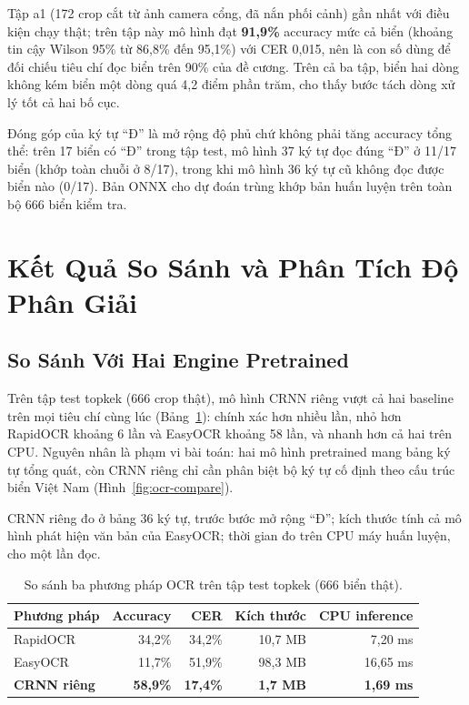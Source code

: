 Tập a1 (172 crop cắt từ ảnh camera cổng, đã nắn phối cảnh) gần nhất với điều kiện chạy thật;
trên tập này mô hình đạt \textbf{91,9\%} accuracy mức cả biển (khoảng tin cậy Wilson 95\% từ
86,8\% đến 95,1\%) với CER 0,015, nên là con số dùng để đối chiếu tiêu chí đọc biển trên
90\% của đề cương. Trên cả ba tập, biển hai dòng không kém biển một
dòng quá 4,2 điểm phần trăm, cho thấy bước tách dòng xử lý tốt cả hai bố cục.

Đóng góp của ký tự ``Đ'' là mở rộng độ phủ chứ không phải tăng accuracy tổng thể: trên 17
biển có ``Đ'' trong tập test, mô hình 37 ký tự đọc đúng ``Đ'' ở 11/17 biển (khớp toàn chuỗi
ở 8/17), trong khi mô hình 36 ký tự cũ không đọc được biển nào (0/17). Bản ONNX cho dự đoán
trùng khớp bản huấn luyện trên toàn bộ 666 biển kiểm tra.

\section{Kết Quả So Sánh và Phân Tích Độ Phân Giải}
\label{sec:ocr-ketqua}

\subsection{So Sánh Với Hai Engine Pretrained}

Trên tập test topkek (666 crop thật), mô hình CRNN riêng vượt cả hai baseline trên mọi tiêu
chí cùng lúc (Bảng~\ref{tab:ocr-compare}): chính xác hơn nhiều lần, nhỏ hơn RapidOCR khoảng 6
lần và EasyOCR khoảng 58 lần, và nhanh hơn cả hai trên CPU. Nguyên nhân là phạm vi bài toán:
hai mô hình pretrained mang bảng ký tự tổng quát, còn CRNN riêng chỉ cần phân biệt bộ ký tự
cố định theo cấu trúc biển Việt Nam (Hình~\ref{fig:ocr-compare}).

\begin{table}[htbp]
\centering
\caption{So sánh ba phương pháp OCR trên tập test topkek (666 biển thật).}

{\footnotesize CRNN riêng đo ở bảng 36 ký tự, trước bước mở rộng ``Đ''; kích thước tính cả mô hình phát hiện văn bản của EasyOCR; thời gian đo trên CPU máy huấn luyện, cho một lần đọc.}
\label{tab:ocr-compare}
\begin{tabular}{lrrrr}
\toprule
Phương pháp & Accuracy & CER & Kích thước & CPU inference \\
\midrule
RapidOCR~\autocite{rapidocr} & 34,2\% & 34,2\% & 10,7 MB & 7,20 ms \\
EasyOCR~\autocite{easyocr}   & 11,7\% & 51,9\% & 98,3 MB & 16,65 ms \\
\textbf{CRNN riêng}         & \textbf{58,9\%} & \textbf{17,4\%} & \textbf{1,7 MB} & \textbf{1,69 ms} \\
\bottomrule
\end{tabular}
\end{table}


